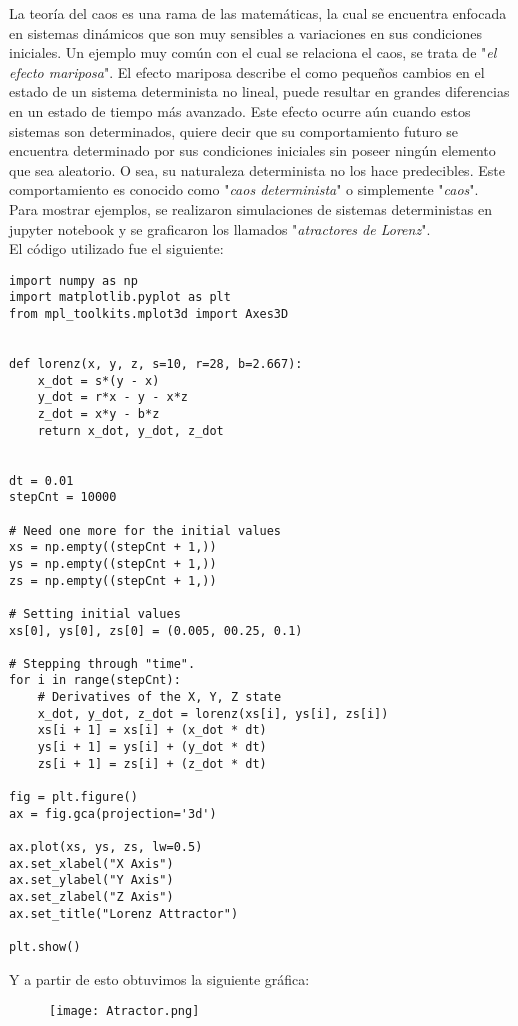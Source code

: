 \documentclass{article}
\begin{document}
La teoría del caos es una rama de las matemáticas, la cual se encuentra enfocada en sistemas dinámicos que son muy sensibles a variaciones en sus condiciones iniciales. Un ejemplo muy común con el cual se relaciona el caos, se trata de "\textit{el efecto mariposa}". El efecto mariposa describe el como pequeños cambios en el estado de un sistema determinista no lineal, puede resultar en grandes diferencias en un estado de tiempo más avanzado. Este efecto ocurre aún cuando estos sistemas son determinados, quiere decir que su comportamiento futuro se encuentra determinado por sus condiciones iniciales sin poseer ningún elemento que sea aleatorio. O sea, su naturaleza determinista no los hace predecibles. Este comportamiento es conocido como "\textit{caos determinista}" o simplemente "\textit{caos}".\\

Para mostrar ejemplos, se realizaron simulaciones de sistemas deterministas en jupyter notebook y se graficaron los llamados "\textit{atractores de Lorenz}".\\

El código utilizado fue el siguiente:\\
\begin{verbatim}
import numpy as np
import matplotlib.pyplot as plt
from mpl_toolkits.mplot3d import Axes3D


def lorenz(x, y, z, s=10, r=28, b=2.667):
    x_dot = s*(y - x)
    y_dot = r*x - y - x*z
    z_dot = x*y - b*z
    return x_dot, y_dot, z_dot


dt = 0.01
stepCnt = 10000

# Need one more for the initial values
xs = np.empty((stepCnt + 1,))
ys = np.empty((stepCnt + 1,))
zs = np.empty((stepCnt + 1,))

# Setting initial values
xs[0], ys[0], zs[0] = (0.005, 00.25, 0.1)

# Stepping through "time".
for i in range(stepCnt):
    # Derivatives of the X, Y, Z state
    x_dot, y_dot, z_dot = lorenz(xs[i], ys[i], zs[i])
    xs[i + 1] = xs[i] + (x_dot * dt)
    ys[i + 1] = ys[i] + (y_dot * dt)
    zs[i + 1] = zs[i] + (z_dot * dt)

fig = plt.figure()
ax = fig.gca(projection='3d')

ax.plot(xs, ys, zs, lw=0.5)
ax.set_xlabel("X Axis")
ax.set_ylabel("Y Axis")
ax.set_zlabel("Z Axis")
ax.set_title("Lorenz Attractor")

plt.show()
\end{verbatim}
Y a partir de esto obtuvimos la siguiente gráfica:\\
\begin{figure}[h]
\centering
\texttt{[image: Atractor.png]}
\end{figure}\\
\end{document}
